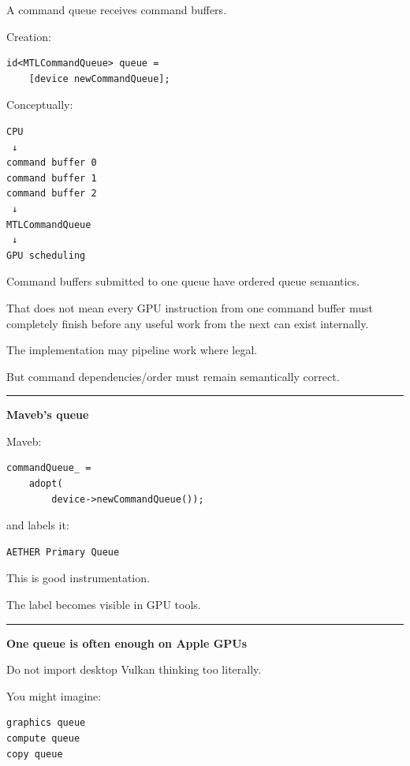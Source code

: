 A command queue receives command buffers.

Creation:

\begin{verbatim}
id<MTLCommandQueue> queue =
    [device newCommandQueue];
\end{verbatim}

Conceptually:

\begin{verbatim}
CPU
 ↓
command buffer 0
command buffer 1
command buffer 2
 ↓
MTLCommandQueue
 ↓
GPU scheduling
\end{verbatim}

Command buffers submitted to one queue have ordered queue semantics.

That does not mean every GPU instruction from one command buffer must completely finish before any useful work from the next can exist internally.

The implementation may pipeline work where legal.

But command dependencies/order must remain semantically correct.

\begin{center}\rule{0.5\linewidth}{0.5pt}\end{center}

\textbf{Maveb's queue}

Maveb:

\begin{verbatim}
commandQueue_ =
    adopt(
        device->newCommandQueue());
\end{verbatim}

and labels it:

\begin{verbatim}
AETHER Primary Queue
\end{verbatim}

This is good instrumentation.

The label becomes visible in GPU tools.

\begin{center}\rule{0.5\linewidth}{0.5pt}\end{center}

\textbf{One queue is often enough on Apple GPUs}

Do not import desktop Vulkan thinking too literally.

You might imagine:

\begin{verbatim}
graphics queue
compute queue
copy queue
\end{verbatim}

